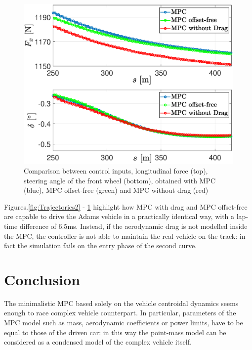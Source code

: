 \documentclass[conference]{IEEEtran} %
\begin{document}
\begin{figure}[htb] \centering
	\includegraphics[width=1.\linewidth]{steer_fx} %
	\caption{Comparison between control inputs, longitudinal force (top), steering angle of the front wheel (bottom), obtained with MPC (blue), MPC offset-free (green) and MPC without drag (red)}
	\label{fig:steer_fx}
\end{figure}

Figures.\ref{fig:Trajectories2} - \ref{fig:steer_fx} highlight how MPC with drag and MPC offset-free are capable to drive the Adams vehicle in a practically identical way, with a lap-time difference of $6.5$ms. Instead, if the aerodynamic drag is not modelled inside the MPC, the controller is not able to maintain the real vehicle on the track: in fact the simulation fails on the entry phase of the second curve.



\section{Conclusion}
The minimalistic MPC based solely on the vehicle centroidal dynamics seems enough to race complex vehicle counterpart.
In particular, parameters of the MPC model such as mass, aerodynamic coefficients or power limits, have to be equal to those of the driven car: in this way the point-mass model can be considered as a condensed model of the complex vehicle itself.
\end{document}

